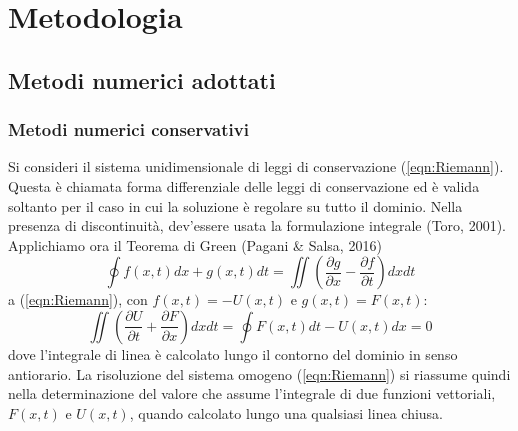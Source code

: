 \documentclass[12pt]{article} %
\begin{document}
\section{Metodologia}
\subsection{Metodi numerici adottati}
\subsubsection{Metodi numerici conservativi}
\noindent Si consideri il sistema unidimensionale di leggi di conservazione (\ref{eqn:Riemann}). Questa è chiamata forma differenziale delle leggi di conservazione ed è valida soltanto per il caso in cui la soluzione è regolare su tutto il dominio. Nella presenza di discontinuità, dev'essere usata la formulazione integrale (Toro, 2001).
\noindent Applichiamo ora il Teorema di Green (Pagani \& Salsa, 2016)
\begin{equation}
    \oint f(x,t)dx + g(x,t)dt = \iint \left(\frac{\partial g}{\partial x}-\frac{\partial f}{\partial t}\right)dxdt
    \label{eqn:teorema_Green}
\end{equation}
\noindent a (\ref{eqn:Riemann}), con $f(x,t) = -U(x,t)$ e $g(x,t) = F(x,t)$:
\begin{equation}
    \iint \left(\frac{\partial U}{\partial t}+\frac{\partial F}{\partial x}\right)dxdt = \oint F(x,t)dt - U(x,t)dx = 0
    \label{eqn:teorema_Green_app_Riemann}
\end{equation}
\noindent dove l'integrale di linea è calcolato lungo il contorno del dominio in senso antiorario. La risoluzione del sistema omogeno (\ref{eqn:Riemann}) si riassume quindi nella determinazione del valore che assume l'integrale di due funzioni vettoriali, $F(x,t)$ e $U(x,t)$, quando calcolato lungo una qualsiasi linea chiusa. 
\end{document}
